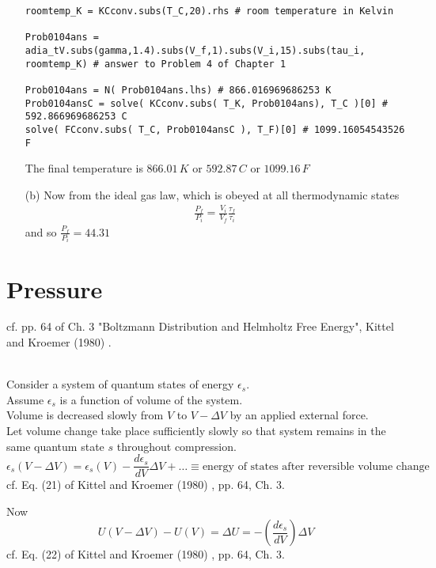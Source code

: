 \documentclass[10pt]{amsart}
\begin{document}
\begin{multicols*}{2}
\begin{enumerate}
\begin{lstlisting}
roomtemp_K = KCconv.subs(T_C,20).rhs # room temperature in Kelvin                               

Prob0104ans = adia_tV.subs(gamma,1.4).subs(V_f,1).subs(V_i,15).subs(tau_i, roomtemp_K) # answer to Problem 4 of Chapter 1                                                                           

Prob0104ans = N( Prob0104ans.lhs) # 866.016969686253 K                                         
Prob0104ansC = solve( KCconv.subs( T_K, Prob0104ans), T_C )[0] # 592.866969686253 C            
solve( FCconv.subs( T_C, Prob0104ansC ), T_F)[0] # 1099.16054543526 F   
\end{lstlisting}

The final temperature is $866.01 \, K$ or $592.87 \, C$ or $1099.16 \, F$

\item[(b)] Now from the ideal gas law, which is obeyed at all thermodynamic states
\[
\begin{gathered}
  \frac{P_f}{ P_i} = \frac{V_i}{V_f} \frac{ \tau_f}{ \tau_i}
\end{gathered}
\]
and so $\frac{P_f}{P_i} = 44.31$
\end{enumerate}

\section{Pressure} 

cf. pp. 64 of Ch. 3 "Boltzmann Distribution and Helmholtz Free Energy", Kittel and Kroemer (1980) \cite{CKittelHKroemer1980}.

\quad \\ 
Consider a system of quantum states of energy $\epsilon_s$. \\
Assume $\epsilon_s$ is a function of volume of the system. \\
Volume is decreased slowly from $V$ to $V-\Delta V$ by an applied external force. \\
Let volume change take place sufficiently slowly so that system remains in the same quantum state $s$ throughout compression.
\[
\epsilon_s(V-\Delta V) = \epsilon_s(V) - \frac{d\epsilon_s}{ dV} \Delta V + \dots \equiv  \text{energy of states after reversible volume change }
\]
cf. Eq. (21) of Kittel and Kroemer (1980) \cite{CKittelHKroemer1980}, pp. 64, Ch. 3. 

Now
\[
U(V- \Delta V) - U(V) = \Delta U = -\left( \frac{d\epsilon_s}{ dV} \right)\Delta V
\]
cf. Eq. (22) of Kittel and Kroemer (1980) \cite{CKittelHKroemer1980}, pp. 64, Ch. 3. 


\end{multicols*}
\end{document}

